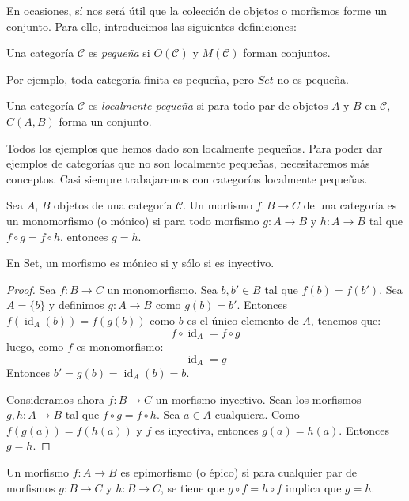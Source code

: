 \documentclass[12pt, twoside]{book}
\newcommand{\cat}{{\mathcal{C}}}
\newcommand{\Set}{{Set}}
\DeclareMathOperator{\id}{id}
\begin{document}
En ocasiones, sí nos será útil que la colección de objetos o morfismos forme un conjunto.
Para ello, introducimos las siguientes definiciones:

\begin{definition}
Una categoría $\cat$ es \emph{pequeña} si $O(\cat)$ y $M(\cat)$ forman conjuntos.
\end{definition}

Por ejemplo, toda categoría finita es pequeña, pero $\Set$ no es pequeña.

\begin{definition}
Una categoría $\cat$ es \emph{localmente pequeña} si para todo par de objetos $A$ y $B$ en $\cat$, $C(A,B)$ forma un conjunto.
\end{definition}

Todos los ejemplos que hemos dado son localmente pequeños.
Para poder dar ejemplos de categorías que no son localmente pequeñas, necesitaremos más conceptos.
Casi siempre trabajaremos con categorías localmente pequeñas.

\begin{definition}
Sea $A$, $B$ objetos de una categoría $\cat$.
Un morfismo $f \colon B \to C$ de una categoría es un monomorfismo (o mónico) si para todo morfismo $g \colon A \to B$ y $h \colon A \to B$ tal que $f \circ g = f \circ h$, entonces $g = h$.
\end{definition}

\begin{proposition}
En \Set, un morfismo es mónico si y sólo si es inyectivo.
\end{proposition}

\begin{proof}
Sea $f \colon B \to C$ un monomorfismo. Sea $b, b' \in B$ tal que $f(b) = f(b')$. Sea $A = \{b\}$ y definimos $g \colon A \to B$ como $g(b)=b'$.
Entonces $f(\id_A(b)) = f(g(b))$
como $b$ es el único elemento de $A$, tenemos que:
\[ f \circ \id_A = f \circ g \]
luego, como $f$ es monomorfismo:
\[ \id_A = g \]
Entonces $b'=g(b)=\id_A(b)=b$.

Consideramos ahora $f \colon B \to C$ un morfismo inyectivo.
Sean los morfismos $g, h \colon A \to B$ tal que $f \circ g = f \circ h$.
Sea $a \in A$ cualquiera. Como $f(g(a)) = f(h(a))$ y $f$ es inyectiva, entonces $g(a) = h(a)$.
Entonces $g = h$. 
\end{proof}

\begin{definition}
Un morfismo $f \colon A \to B$ es epimorfismo (o épico) si para cualquier par de morfismos $g \colon B \to C$ y $h \colon B \to C$, se tiene que $g \circ f = h \circ f$ implica que $g = h$.
\end{definition}
\end{document}

